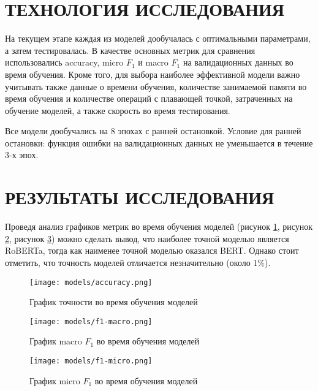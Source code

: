 \section{ТЕХНОЛОГИЯ ИССЛЕДОВАНИЯ}
На текущем этапе каждая из моделей дообучалась с оптимальными параметрами, а затем тестировалась. В качестве основных метрик для сравнения использовались accuracy, micro $F_1$ и macro $F_1$ на валидационных данных во время обучения. Кроме того, для выбора наиболее эффективной модели важно учитывать также данные о времени обучения, количестве занимаемой памяти во время обучения и количестве операций с плавающей точкой, затраченных на обучение моделей, а также скорость во время тестирования.

Все модели дообучались на 8 эпохах с ранней остановкой. Условие для ранней остановки: 
функция ошибки на валидационных данных не уменьшается в течение 3-х эпох.
\section{РЕЗУЛЬТАТЫ ИССЛЕДОВАНИЯ}
Проведя анализ графиков метрик во время обучения моделей 
(рисунок \ref{models-accuracy:image}, рисунок \ref{f1-macro:image}, рисунок \ref{f1-micro:image}) можно сделать вывод, что наиболее точной 
моделью является RoBERTa, тогда как наименее точной моделью оказался BERT. Однако стоит отметить, что точность моделей отличается незначительно 
(около 1\%). 
\begin{figure}[H]
   \begin{center}
      \texttt{[image: models/accuracy.png]}
      \caption{График точности во время обучения моделей}
      \label{models-accuracy:image}
   \end{center}
\end{figure}

\begin{figure}[H]
   \begin{center}
      \texttt{[image: models/f1-macro.png]}
      \caption{График macro $F_1$ во время обучения моделей}
      \label{f1-macro:image}
   \end{center}
\end{figure}

\begin{figure}[H]
   \begin{center} 
      \texttt{[image: models/f1-micro.png]}
      \caption{График micro $F_1$ во время обучения моделей}
      \label{f1-micro:image}
   \end{center} 
\end{figure}

